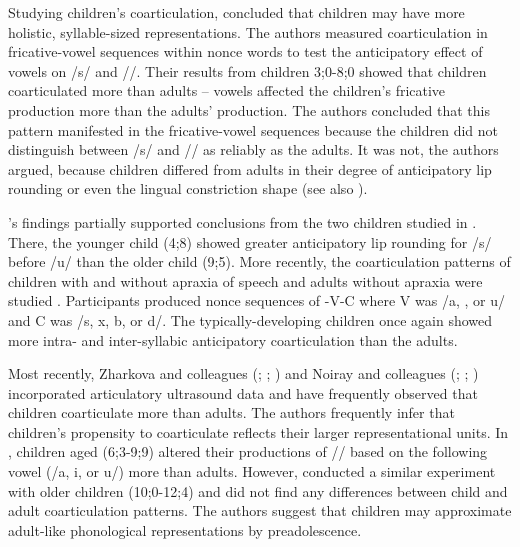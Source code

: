 \documentclass[a4paper,man,floatsintext,natbib,donotrepeattitle, apacite]{apa6}
\begin{document}
Studying children's coarticulation, \citet{nittrouerEmergencePhoneticSegments1989} concluded that children may have more holistic, syllable-sized representations. The authors measured coarticulation in fricative-vowel sequences within nonce words to test the anticipatory effect of vowels on /s/ and /\textesh/. Their results from children 3;0-8;0 showed that children coarticulated more than adults – vowels affected the children's fricative production more than the adults' production. The authors concluded that this pattern manifested in the fricative-vowel sequences because the children did not distinguish between /s/ and /\textesh/ as reliably as the adults. It was not, the authors argued, because children differed from adults in their degree of anticipatory lip rounding or even the lingual constriction shape (see also \citealt{nittrouerHowChildrenLearn1996}).

\citet{nittrouerEmergencePhoneticSegments1989}'s findings partially supported conclusions from the two children studied in \citet{reppObservationsDevelopmentAnticipatory1986}. There, the younger child (4;8) showed greater anticipatory lip rounding for /s/ before /u/ than the older child (9;5). More recently, the coarticulation patterns of children with and without apraxia of speech and adults without apraxia were studied \citep{nijlandCoarticulationPatternsChildren2002}. Participants produced nonce sequences of \textschwa-V-C where V was /a, \textsci, or u/ and C was /s, x, b, or d/. The typically-developing children once again showed more intra- and inter-syllabic anticipatory coarticulation than the adults.

Most recently, Zharkova and colleagues (\citealt{zharkovaCoarticulationIndicatorSpeech2011}; \citealt{zharkovaSpatialTemporalLingual2014}; \citealt{zharkovaDynamicsVoicelessSibilant2018}) and Noiray and colleagues (\citealt{noirayHowChildrenOrganize2018}; \citealt{noirayBackFutureNonlinear2019}; \citealt{rubertusDevelopmentGesturalOrganization2018}) incorporated articulatory ultrasound data and have frequently observed that children coarticulate more than adults. The authors frequently infer that children's propensity to coarticulate reflects their larger representational units. In \citet{zharkovaCoarticulationIndicatorSpeech2011}, children aged (6;3-9;9) altered their productions of /\textesh/ based on the following vowel (/a, i, or u/) more than adults. However, \citet{zharkovaSpatialTemporalLingual2014} conducted a similar experiment with older children (10;0-12;4) and did not find any differences between child and adult coarticulation patterns. The authors suggest that children may approximate adult-like phonological representations by preadolescence. 
\end{document}
